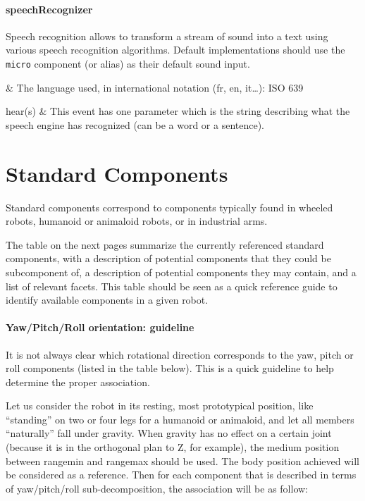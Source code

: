\paragraph{speechRecognizer}

Speech recognition allows to transform a stream of sound into a text
using various speech recognition algorithms. Default implementations
should use the \texttt{micro} component (or alias) as their default
sound input.

\begin{slots}
 &
The language used, in international
notation (fr, en, it…): ISO 639\\\hline
\end{slots}

\begin{slots}[Events]
hear(s) &
This event has one parameter which is
the string describing what the speech engine has recognized (can be a
word or a sentence).\\\hline
\end{slots}

\section{Standard Components}

Standard components correspond to components typically found in wheeled
robots, humanoid or animaloid robots, or in industrial arms.


The table on the next pages summarize the currently referenced standard
components, with a description of potential components that they could
be subcomponent of, a description of potential components they may
contain, and a list of relevant facets. This table should be seen as a
quick reference guide to identify available components in a given
robot.

\paragraph{Yaw/Pitch/Roll orientation: guideline}


It is not always clear which rotational direction corresponds to the
yaw, pitch or roll components (listed in the table below). This is a
quick guideline to help determine the proper association.


Let us consider the robot in its resting, most prototypical position,
like “standing” on two or four legs for a humanoid or animaloid, and
let all members “naturally” fall under gravity. When gravity has no
effect on a certain joint (because it is in the orthogonal plan to Z,
for example), the medium position between rangemin and rangemax should
be used. The body position achieved will be considered as a reference.
Then for each component that is described in terms of yaw/pitch/roll
sub-decomposition, the association will be as follow:

